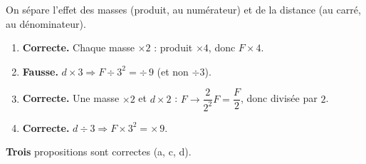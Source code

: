 \documentclass[11pt,a4paper]{article}
\begin{document}
\begin{corrige}
On sépare l'effet des masses (produit, au numérateur) et de la distance (au carré,
au dénominateur).
\begin{enumerate}[label=\alph*)]
  \item \textbf{Correcte.} Chaque masse $\times 2$ : produit $\times 4$, donc $F\times 4$.
  \item \textbf{Fausse.} $d\times 3\Rightarrow F\div 3^2=\div\,9$ (et non $\div 3$).
  \item \textbf{Correcte.} Une masse $\times 2$ et $d\times 2$ : $F\to\dfrac{2}{2^2}F
        =\dfrac{F}{2}$, donc divisée par $2$.
  \item \textbf{Correcte.} $d\div 3\Rightarrow F\times 3^2=\times\,9$.
\end{enumerate}
\textbf{Trois} propositions sont correctes (a, c, d).
\end{corrige}
\end{document}

